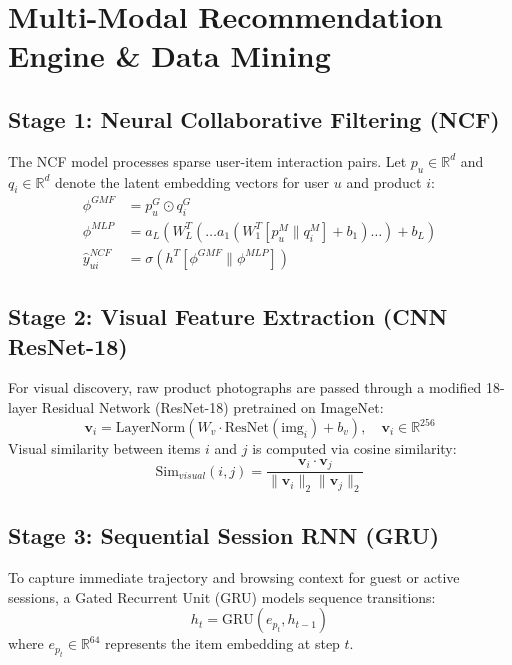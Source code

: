 \documentclass[12pt,a4paper,oneside]{report}
\begin{document}
\chapter{Multi-Modal Recommendation Engine \& Data Mining}

\section{Stage 1: Neural Collaborative Filtering (NCF)}
The NCF model processes sparse user-item interaction pairs. Let $p_u \in \mathbb{R}^d$ and $q_i \in \mathbb{R}^d$ denote the latent embedding vectors for user $u$ and product $i$:
\begin{align}
    \phi^{GMF} &= p_u^G \odot q_i^G \\
    \phi^{MLP} &= a_L \left( W_L^T \left( \dots a_1(W_1^T [p_u^M \parallel q_i^M] + b_1) \dots \right) + b_L \right) \\
    \hat{y}_{ui}^{NCF} &= \sigma \left( h^T [\phi^{GMF} \parallel \phi^{MLP}] \right)
\end{align}

\section{Stage 2: Visual Feature Extraction (CNN ResNet-18)}
For visual discovery, raw product photographs are passed through a modified 18-layer Residual Network (ResNet-18) pretrained on ImageNet:
\begin{equation}
    \mathbf{v}_i = \text{LayerNorm} \left( W_v \cdot \text{ResNet}(\text{img}_i) + b_v \right), \quad \mathbf{v}_i \in \mathbb{R}^{256}
\end{equation}
Visual similarity between items $i$ and $j$ is computed via cosine similarity:
\begin{equation}
    \text{Sim}_{visual}(i, j) = \frac{\mathbf{v}_i \cdot \mathbf{v}_j}{\|\mathbf{v}_i\|_2 \|\mathbf{v}_j\|_2}
\end{equation}

\section{Stage 3: Sequential Session RNN (GRU)}
To capture immediate trajectory and browsing context for guest or active sessions, a Gated Recurrent Unit (GRU) models sequence transitions:
\begin{equation}
    h_t = \text{GRU}(e_{p_t}, h_{t-1})
\end{equation}
where $e_{p_t} \in \mathbb{R}^{64}$ represents the item embedding at step $t$.
\end{document}
